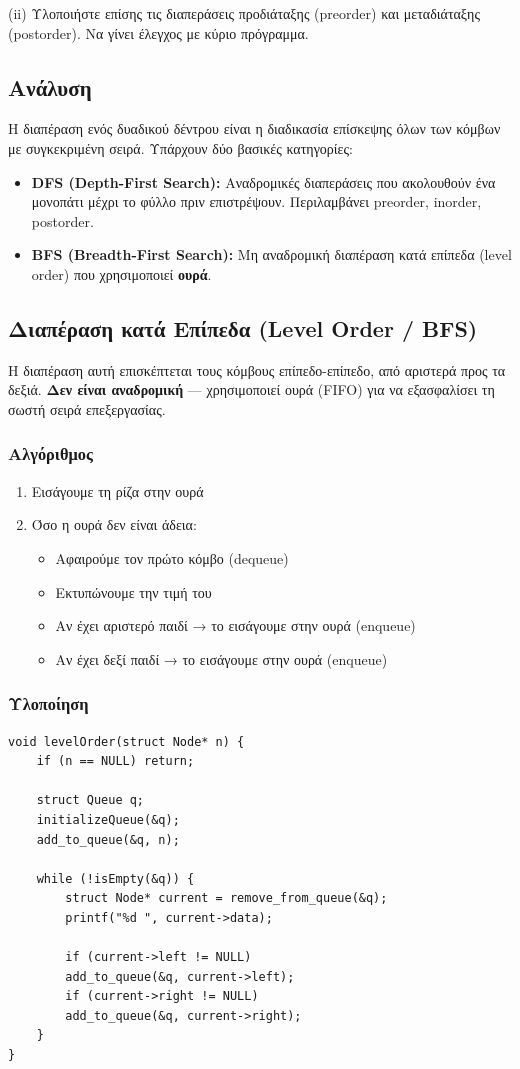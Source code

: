 \documentclass[a4paper,12pt]{article}
\begin{document}
	(ii) Υλοποιήστε επίσης τις διαπεράσεις προδιάταξης (preorder) και μεταδιάταξης 
	(postorder). Να γίνει έλεγχος με κύριο πρόγραμμα.
	
	\subsection{Ανάλυση}
	Η διαπέραση ενός δυαδικού δέντρου είναι η διαδικασία επίσκεψης όλων των κόμβων 
	με συγκεκριμένη σειρά. Υπάρχουν δύο βασικές κατηγορίες:
	
	\begin{itemize}
		\item \textbf{DFS (Depth-First Search):} Αναδρομικές διαπεράσεις που 
		ακολουθούν ένα μονοπάτι μέχρι το φύλλο πριν επιστρέψουν. 
		Περιλαμβάνει preorder, inorder, postorder.
		\item \textbf{BFS (Breadth-First Search):} Μη αναδρομική διαπέραση κατά 
		επίπεδα (level order) που χρησιμοποιεί \textbf{ουρά}.
	\end{itemize}
	
	\subsection{Διαπέραση κατά Επίπεδα (Level Order / BFS)}
	Η διαπέραση αυτή επισκέπτεται τους κόμβους επίπεδο-επίπεδο, από αριστερά 
	προς τα δεξιά. \textbf{Δεν είναι αναδρομική} — χρησιμοποιεί ουρά (FIFO) 
	για να εξασφαλίσει τη σωστή σειρά επεξεργασίας.
	
	\subsubsection{Αλγόριθμος}
	\begin{enumerate}
		\item Εισάγουμε τη ρίζα στην ουρά
		\item Όσο η ουρά δεν είναι άδεια:
		\begin{itemize}
			\item Αφαιρούμε τον πρώτο κόμβο (dequeue)
			\item Εκτυπώνουμε την τιμή του
			\item Αν έχει αριστερό παιδί → το εισάγουμε στην ουρά (enqueue)
			\item Αν έχει δεξί παιδί → το εισάγουμε στην ουρά (enqueue)
		\end{itemize}
	\end{enumerate}
	
	\subsubsection{Υλοποίηση}
	\begin{lstlisting}
void levelOrder(struct Node* n) {
	if (n == NULL) return;
	
	struct Queue q;
	initializeQueue(&q);
	add_to_queue(&q, n);        
	
	while (!isEmpty(&q)) {
		struct Node* current = remove_from_queue(&q);
		printf("%d ", current->data);
		
		if (current->left != NULL)
		add_to_queue(&q, current->left);
		if (current->right != NULL)
		add_to_queue(&q, current->right);
	}
}
	\end{lstlisting}
	
\end{document}

